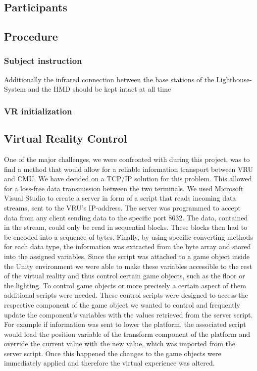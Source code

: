\subsection{Participants}
\subsection{Procedure}
\subsubsection{Subject instruction}
Additionally the infrared connection between the base stations of the Lighthouse-System and the HMD should be kept intact at all time
\subsubsection{VR initialization}

\subsection{Virtual Reality Control}\label{VRControl}
One of the major challenges, we were confronted with during this project, was to find a method that would allow for a reliable information transport between VRU and CMU. We have decided on a TCP/IP solution for this problem. This allowed for a loss-free data transmission between the two terminals. 
We used Microsoft Visual Studio to create a server in form of a script that reads incoming data streams, sent to the VRU's IP-address. The server was programmed to accept data from any client sending data to the specific port 8632. The data, contained in the stream, could only be read in sequential blocks. These blocks then had to be encoded into a sequence of bytes. Finally, by using specific converting methods for each data type, the information was extracted from the byte array and stored into the assigned variables. Since the script was attached to a game object inside the Unity environment we were able to make these variables accessible to the rest of the virtual reality and thus control certain game objects, such as the floor or the lighting. To control game objects or more precisely a certain aspect of them additional scripts were needed. These control scripts were designed to access the respective component of the game object we wanted to control and frequently update the component's variables with the values retrieved from the server script. For example if information was sent to lower the platform, the associated script would load the position variable of the transform component of the platform and override the current value with the new value, which was imported from the server script. Once this happened the changes to the game objects were immediately applied and therefore the virtual experience was altered.\\

